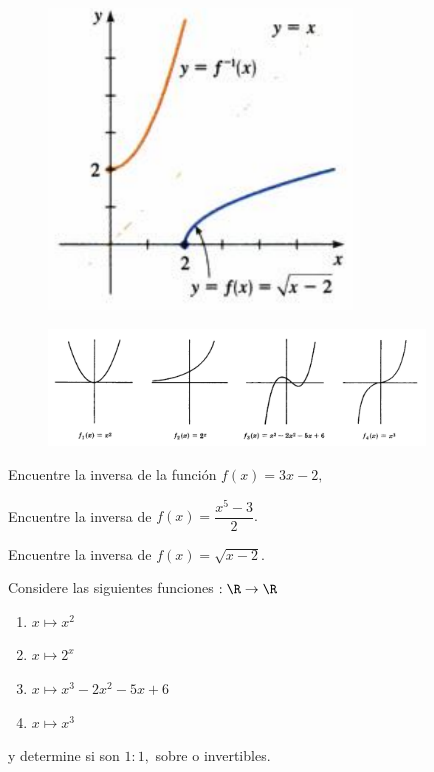 \begin{figure}
	\centering
	\includegraphics[height=8cm,keepaspectratio=true]{./md/MD02_sqrt_x-2.png}
	\label{fig:MD02_sqrt_x-2}
\end{figure}

\begin{figure}
	\centering
	\includegraphics[width=10cm]{./md/MD02_IM02.png}
	\label{fig:MD0202}
\end{figure}



\begin{problema}
	Encuentre la inversa de la función $f(x)=3x-2,$
\end{problema}




\begin{problema}
	Encuentre la inversa de $f(x)=\dfrac{x^{5}-3}{2}.$
\end{problema}




\begin{problema}
	Encuentre la inversa de $f(x)=\sqrt{x-2}.$
\end{problema}



\begin{problema}
	Considere las siguientes funciones $:\R \to \R$
	\begin{enumerate}
		\item $x \mapsto x^{2}$
		\item $x \mapsto 2^{x}$
		\item $x \mapsto x^{3}-2x^{2}-5x+6$
		\item $x \mapsto x^{3}$
	\end{enumerate}
	y determine si son $1:1,$ sobre o invertibles.
\end{problema}